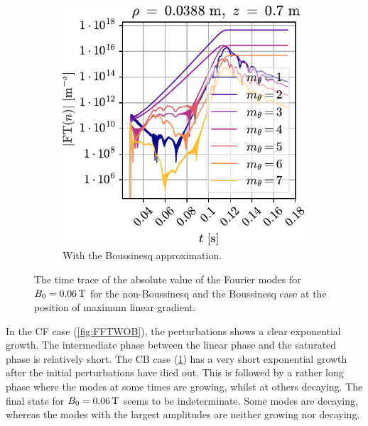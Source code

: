 \begin{figure}[htbp]
\begin{subfigure}[h]{0.45\textwidth}
        \includegraphics{fig/results/compareBouss/FFT006B}
        \caption{With the Boussinesq approximation.}
        \label{fig:FFTWB}
    \end{subfigure}
    \caption{The time trace of the absolute value of the Fourier modes for $B_0=0.06\, \text{T}$ for the non-Boussinesq and the Boussinesq case at the position of maximum linear gradient.
    }
    \label{fig:FFTCompB}
\end{figure}
%
In the CF case (\cref{fig:FFTWOB}), the perturbations shows a clear exponential growth.
The intermediate phase between the linear phase and the saturated phase is relatively short.
The CB case (\cref{fig:FFTWB}) has a very short exponential growth after the initial perturbations have died out.
This is followed by a rather long phase where the modes at some times are growing, whilst at others decaying.
The final state for $B_0=0.06\, \text{T}$ seems to be indeterminate.
Some modes are decaying, whereas the modes with the largest amplitudes are neither growing nor decaying.

